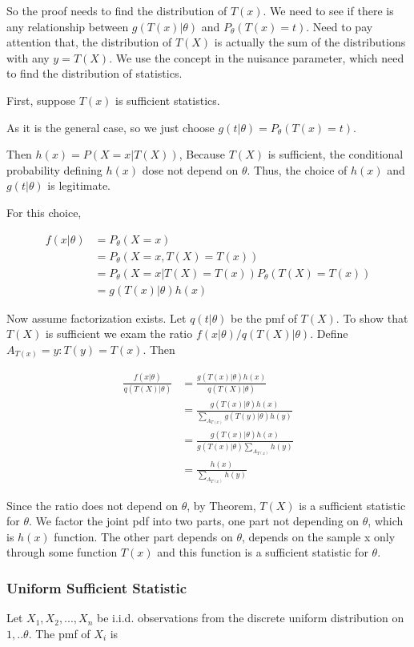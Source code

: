 So the proof needs to find the distribution of $T(x)$. We need to see if there is any relationship between $g(T(x)| \theta)$ and $P_{\theta}(T(x) = t)$. Need to pay attention that, the distribution of $T(X)$ is actually the sum of the distributions with any $y = T(X)$. We use the concept in the nuisance parameter, which need to find the distribution of statistics.


First, suppose $T(x)$ is sufficient statistics. 

As it is the general case, so we just choose 
$g(t| \theta) = P_{\theta}(T(x) = t)$.

Then $h(x) = P(X=x | T(X))$, Because $T(X)$ is sufficient, the conditional probability defining  
$h(x)$ dose not depend on $\theta$. Thus, the choice of $h(x)$ and $g(t|\theta)$ is legitimate.

For this choice,

\begin{align*}
	f(x | \theta) &= P_{\theta}(X = x) \\
	&=  P_{\theta}(X = x, T(X)= T(x)) \\
	&= P_{\theta}(X = x | T(X)= T(x)) P_{\theta}(T(X) = T(x)) \\
	&= g(T(x)| \theta) h(x)
\end{align*}

Now assume factorization exists. Let $q(t|\theta)$ be the pmf of $T(X)$. To show that $T(X)$ is sufficient we exam the ratio $f(x|\theta) / q(T(X)|\theta)$. Define $A_{T(x)} = y: T(y) = T(x)$. Then

\begin{align*}
	\frac{f(x | \theta)}{q(T(X)|\theta)} &= \frac{g(T(x)| \theta) h(x)}{q(T(X)|\theta)} \\
	&=  \frac{g(T(x)| \theta) h(x)}{\sum_{A_{T(x)} } g(T(y)| \theta) h(y)} \\
	&=  \frac{g(T(x)| \theta) h(x)}{g(T(x)| \theta) \sum_{A_{T(x)} }  h(y)} \\
	&= \frac{h(x)}{\sum_{A_{T(x)} }  h(y)}
\end{align*}

Since the ratio does not depend on $\theta$, by Theorem, $T(X)$ is a sufficient statistic for  
$\theta$. We factor the joint pdf into two parts, one part not depending on $\theta$, which is  
$h(x)$ function. The other part depends on $\theta$, depends on the sample x only through some function $T(x)$ and this function is a sufficient statistic for $\theta$.


\subsubsection{Uniform Sufficient Statistic}
Let $X_1, X_2,..., X_n$ be i.i.d. observations from the discrete uniform distribution on $1,..\theta$. The pmf of $X_i$ is 

